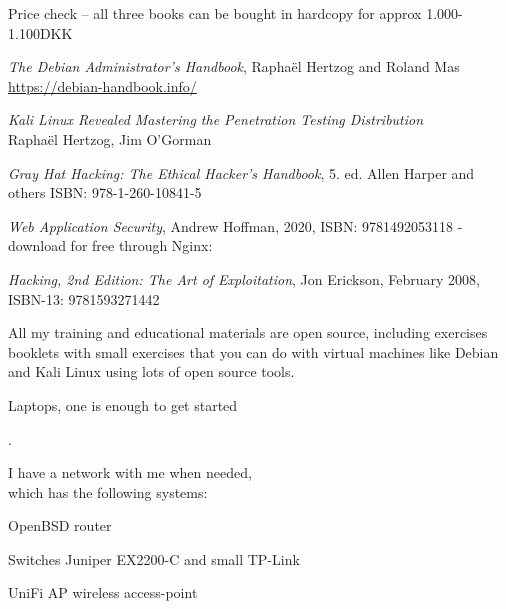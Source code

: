 \documentclass[Screen16to9,17pt]{foils}
\begin{document}
Price check -- all three books can be bought in hardcopy for approx 1.000-1.100DKK



\begin{list2}
\item \emph{The Debian Administrator’s Handbook}, Raphaël Hertzog and Roland Mas\\
\url{https://debian-handbook.info/}
\item \emph{Kali Linux Revealed  Mastering the Penetration Testing Distribution}\\
Raphaël Hertzog, Jim O'Gorman\\

\item \emph{Gray Hat Hacking: The Ethical Hacker's Handbook}, 5. ed. Allen Harper and others ISBN: 978-1-260-10841-5
\item \emph{Web Application Security}, Andrew Hoffman, 2020, ISBN: 9781492053118 - download for free through Nginx:\\

\item \emph{Hacking, 2nd Edition: The Art of Exploitation}, Jon Erickson, February 2008, ISBN-13: 9781593271442
\item All my training and educational materials are open source, including exercises booklets with small exercises that you can do with virtual machines like Debian and Kali Linux using lots of open source tools.\\
{\bf {}}
\end{list2}





Laptops, one is enough to get started

.

\begin{list1}
\item I have a network with me when needed, \\
which has the following systems:
\begin{list2}
\item OpenBSD router
\item Switches Juniper EX2200-C and small TP-Link
\item UniFi AP wireless access-point
\end{list2}
\end{list1}
\end{document}
